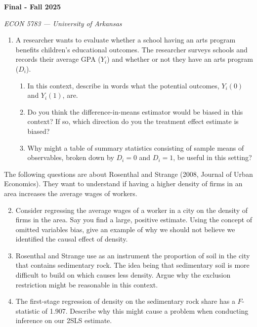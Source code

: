 \documentclass[12pt]{article}
\begin{document}
\begin{center}
  {\Huge\bf Final - Fall 2025}

  \smallskip
  {\large\it ECON 5783 — University of Arkansas}
\end{center}
\medskip

\begin{enumerate}
  \item A researcher wants to evaluate whether a school having an arts program benefits children's educational outcomes. 
  The researcher surveys schools and records their average GPA ($Y_i$) and whether or not they have an arts program ($D_i$).
  \begin{enumerate}
    \item In this context, describe in words what the potential outcomes, $Y_i(0)$ and $Y_i(1)$, are.
    
    \medskip
    \item Do you think the difference-in-means estimator would be biased in this context? 
    If so, which direction do you the treatment effect estimate is biased?
    
    \medskip
    \item Why might a table of summary statistics consisting of sample means of observables, broken down by $D_i = 0$ and $D_i = 1$, be useful in this setting?
  \end{enumerate}
\end{enumerate}

\bigskip\bigskip
\noindent The following questions are about Rosenthal and Strange (2008, Journal of Urban Economics). 
They want to understand if having a higher density of firms in an area increases the average wages of workers. 

\begin{enumerate}
  \setcounter{enumi}{1}
  \item Consider regressing the average wages of a worker in a city on the density of firms in the area. 
  Say you find a large, positive estimate.
  Using the concept of omitted variables bias, give an example of why we should not believe we identified the causal effect of density.

  \medskip
  \item Rosenthal and Strange use as an instrument the proportion of soil in the city that contains sedimentary rock. 
  The idea being that sedimentary soil is more difficult to build on which causes less density. 
  Argue why the exclusion restriction might be reasonable in this context.

  \medskip
  \item The first-stage regression of density on the sedimentary rock share has a $F$-statistic of 1.907. 
  Describe why this might cause a problem when conducting inference on our 2SLS estimate.
\end{enumerate}
\end{document}
